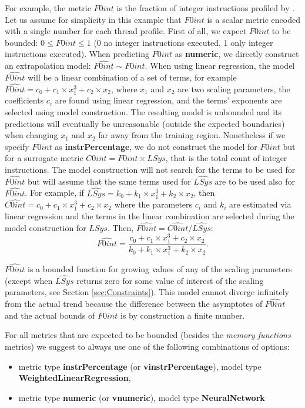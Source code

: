\documentclass[a4paper, 10pt]{article}
\begin{document}
For example, the metric $F0int$ is the fraction of {integer} instructions profiled by \pisa. Let us assume for simplicity in this example
that $F0int$ is a scalar metric encoded with a single number for each thread profile.
First of all, we expect $F0int$ to be bounded: $0\leq F0int \leq 1$ (0 no integer instructions executed, 1 only integer instructions executed).
When predicting $F0int$ as \textbf{numeric}, we directly construct
an extrapolation model: $\widehat{F0int}\sim F0int$. When using linear regression, the model $\widehat{F0int}$ will be a linear combination
of a set of terms, for example $\widehat{F0int}=c_0 + c_1 \times x_1^3 + c_2 \times x_2$, where $x_1$ and $x_2$ are two scaling parameters,
the coefficients $c_i$ are found using linear regression, and the terms' exponents are selected using model construction.
The resulting model is unbounded and its predictions will eventually be unreasonable (outside the expected boundaries)
when changing $x_1$ and $x_2$ far away from the
training region. Nonetheless if we specify $F0int$ as \textbf{instrPercentage}, we do not construct the model for $F0int$
but for a surrogate metric $C0int=F0int \times LSys$, that is the total count of integer instructions. The model
construction will not search for the terms to be used for $\widehat{F0int}$ but will assume that the same terms used for $\widehat{LSys}$
are to be used also for $\widehat{F0int}$. For example, if $\widehat{LSys}=k_0 + k_1 \times x_1^3 + k_2 \times x_2$,
then $\widehat{C0int}=c_0 + c_1 \times x_1^3 + c_2 \times x_2$ where the parameters $c_i$ and $k_i$
are estimated via linear regression and the terms in the linear combination are selected during the model construction for $LSys$.
Then, $\widehat{F0int}=\widehat{C0int} / \widehat{LSys}$:
\begin{equation}
 \widehat{F0int} = \frac{c_0 + c_1 \times x_1^3 + c_2 \times x_2}{k_0 + k_1 \times x_1^3 + k_2 \times x_2}.
\end{equation}

$\widehat{F0int}$ is a bounded function for growing values of any of the scaling parameters
(except when $\widehat{LSys}$ returns zero for some value of interest of the scaling parameters,
see Section \ref{sec:Constraints}). This model cannot diverge infinitely from the actual trend because the difference between the asymptotes
of $\widehat{F0int}$ and the actual bounds of $F0int$ is by construction a finite number.

For all metrics that are expected to be bounded (besides the \textit{memory functions} metrics) we suggest to always use
one of the following combinations of options:
\begin{itemize}
 \item {metric type} \textbf{instrPercentage} (or \textbf{vinstrPercentage}), {model type} \textbf{WeightedLinearRegression},
 \item {metric type} \textbf{numeric} (or \textbf{vnumeric}), {model type} \textbf{NeuralNetwork}
\end{itemize}
\end{document}
